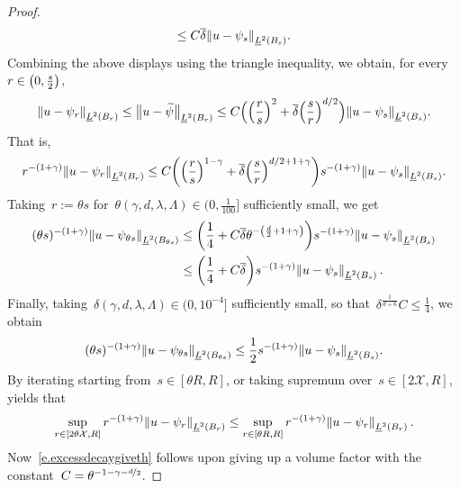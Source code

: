 \documentclass[11pt,twoside]{article} %
\numberwithin{equation}{section}
\theoremstyle{definition}
\let\originalleft\left
\let\originalright\right
\renewcommand{\left}{\mathopen{}\mathclose\bgroup\originalleft}
\renewcommand{\right}{\aftergroup\egroup\originalright}
\renewcommand*{\tilde}{\widetilde}
\newcommand{\X}{\mathcal{X}}
\begin{document}
\begin{proof}
\begin{align*}
\leq C \overline{\delta} \left\| u - \psi_s \right\|_{\underline{L}^2(B_{s})}.
\end{align*}
Combining the above displays using the triangle inequality, we obtain, for every~$r\in \left(0,\tfrac s2 \right)$, 
\begin{equation*}
\left\| u - \psi_r \right\|_{\underline{L}^2(B_{r})}
\leq
\bigl\| u - \tilde{\psi} \bigr\|_{\underline{L}^2(B_{r})}
\leq 
C \Bigl( \left( \frac rs \right)^2 
+ \overline{\delta} \left( \frac sr \right)^{d/2}\Bigr) 
\left\| u - \psi_s \right\|_{\underline{L}^2(B_{s})}.
\end{equation*}
That is, 
\begin{equation*}
r^{-(1+\gamma)} \left\| u - \psi_r \right\|_{\underline{L}^2(B_{r})}
\leq
C \biggl( 
\left( \frac rs \right)^{1-\gamma} 
+ \overline{\delta} \left( \frac sr \right)^{d/2+1+\gamma}\biggr) 
s^{-(1+\gamma)} \left\| u - \psi_s \right\|_{\underline{L}^2(B_{s})}.
\end{equation*}
Taking~$r:=\theta s$ for~$\theta(\gamma,d,\lambda,\Lambda) \in (0,\frac1{100}]$ sufficiently small, we get
\begin{align*}
(\theta s)^{-(1+\gamma)} \left\| u - \psi_{\theta s} \right\|_{\underline{L}^2(B_{\theta s})}
&
\leq
\biggl( \frac 14 + C \overline{\delta} \theta ^{-\left(\frac d2+1+\gamma\right)}\biggr) 
s^{-(1+\gamma)} \left\| u - \psi_s \right\|_{\underline{L}^2(B_{s})}
\\ & 
\leq
\biggl( \frac 14 + C \overline{\delta} \biggr) 
s^{-(1+\gamma)} \left\| u - \psi_s \right\|_{\underline{L}^2(B_{s})}
\,.
\end{align*}
Finally, taking~$\delta(\gamma, d,\lambda,\Lambda)\in (0,10^{-4}]$ sufficiently small, so that~$\delta^{\frac1{d+6}} C \leq \frac14$, we obtain
\begin{equation*}
(\theta s)^{-(1+\gamma)} \left\| u - \psi_{\theta s} \right\|_{\underline{L}^2(B_{\theta s})}
\leq 
\frac12 s^{-(1+\gamma)} \left\| u - \psi_s \right\|_{\underline{L}^2(B_{s})}.
\end{equation*}
By iterating starting from~$s \in [\theta R,R]$, or taking supremum over~$s \in [2\X,R]$, yields that
\begin{equation}
\label{e.excessdecaygiveth.pre}
\sup_{r \in [2\theta \X,R]}
r^{-(1+\gamma)} \left\| u - \psi_{r} \right\|_{\underline{L}^2(B_{r})}
\leq 
\sup_{r \in [\theta R,R]} r^{-(1+\gamma)} \left\| u - \psi_r \right\|_{\underline{L}^2(B_{r})}\,.
\end{equation}
Now~\eqref{e.excessdecaygiveth} follows upon giving up a volume factor with the constant~$C = \theta^{-1-\gamma-\nicefrac d2}$. 


\end{proof}
\end{document}
